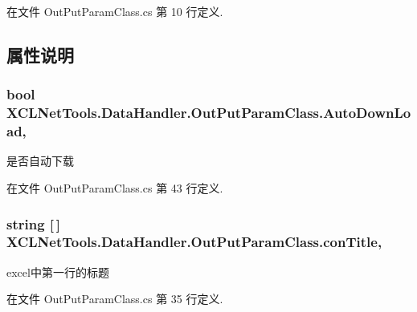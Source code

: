 在文件 Out\-Put\-Param\-Class.\-cs 第 10 行定义.



\subsection{属性说明}
\hypertarget{class_x_c_l_net_tools_1_1_data_handler_1_1_out_put_param_class_a1e1c3490df66e969da5c506f62e39c40}{
\subsubsection[{Auto\-Down\-Load}]{\setlength{\rightskip}{0pt plus 5cm}bool X\-C\-L\-Net\-Tools.\-Data\-Handler.\-Out\-Put\-Param\-Class.\-Auto\-Down\-Load\hspace{0.3cm}{\ttfamily [get]}, {\ttfamily [set]}}}\label{class_x_c_l_net_tools_1_1_data_handler_1_1_out_put_param_class_a1e1c3490df66e969da5c506f62e39c40}


是否自动下载 



在文件 Out\-Put\-Param\-Class.\-cs 第 43 行定义.

\hypertarget{class_x_c_l_net_tools_1_1_data_handler_1_1_out_put_param_class_a748b563923eab10a0c8f5434fb5a3b16}{
\subsubsection[{con\-Title}]{\setlength{\rightskip}{0pt plus 5cm}string \mbox{[}$\,$\mbox{]} X\-C\-L\-Net\-Tools.\-Data\-Handler.\-Out\-Put\-Param\-Class.\-con\-Title\hspace{0.3cm}{\ttfamily [get]}, {\ttfamily [set]}}}\label{class_x_c_l_net_tools_1_1_data_handler_1_1_out_put_param_class_a748b563923eab10a0c8f5434fb5a3b16}


excel中第一行的标题 



在文件 Out\-Put\-Param\-Class.\-cs 第 35 行定义.

